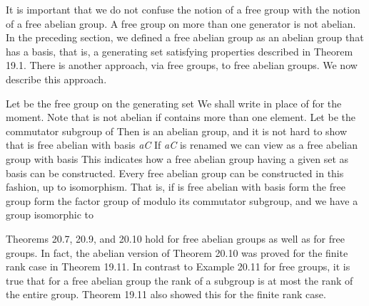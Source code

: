 \documentclass[11pt,oneside]{article}
\begin{document}
\begin{BookBody}

\noindent It is important that we do not confuse the notion of a free group with the notion of a free abelian group. A free group on more than one generator is not abelian. In the preceding section, we defined a free abelian group as an abelian group that has a basis, that is, a generating set satisfying properties described in Theorem 19.1. There is another approach, via free groups, to free abelian groups. We now describe this approach.

Let  be the free group on the generating set  We shall write  in place of  for the moment. Note that  is not abelian if  contains more than one element. Let  be the commutator subgroup of  Then  is an abelian group, and it is not hard to show that  is free abelian with basis \BookInline{\{}\textit{aC}  If\textit{ aC} is renamed  we can view  as a free abelian group with basis  This indicates how a free abelian group having a given set as basis can be constructed. Every free abelian group can be constructed in this fashion, up to isomorphism. That is, if  is free abelian with basis  form the free group  form the factor group of  modulo its commutator subgroup, and we have a group isomorphic to 

Theorems 20.7, 20.9, and 20.10 hold for free abelian groups as well as for free groups. In fact, the abelian version of Theorem 20.10 was proved for the finite rank case in Theorem 19.11. In contrast to Example 20.11 for free groups, it is true that for a free abelian group the rank of a subgroup is at most the rank of the entire group. Theorem 19.11 also showed this for the finite rank case.

\end{BookBody}

\BookNarrativefalse
\end{document}
